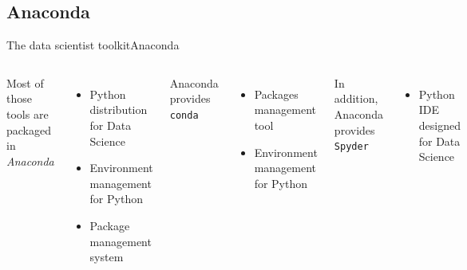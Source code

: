 \documentclass[10pt,compress]{beamer} %
\begin{document}
\subsection{Anaconda}
\begin{frame}{The data scientist toolkit}{Anaconda}
    \begin{columns}
   Most of those tools are packaged in \textit{Anaconda}
   \begin{itemize}
   		\item Python distribution for Data Science
		\item Environment management for Python
		\item Package management system
	\end{itemize}

	Anaconda provides \texttt{conda}
	\begin{itemize}
		\item Packages management tool
		\item Environment management for Python
	\end{itemize}

	In addition, Anaconda provides \texttt{Spyder}
	\begin{itemize}
		\item Python IDE designed for Data Science
	\end{itemize}

		\includegraphics[width=0.6\textwidth]{figs/Anaconda_Logo.png} \\\bigskip
		\includegraphics[width=0.5\textwidth]{figs/spyder.png}	
	\end{columns}
\end{frame}
\end{document}
